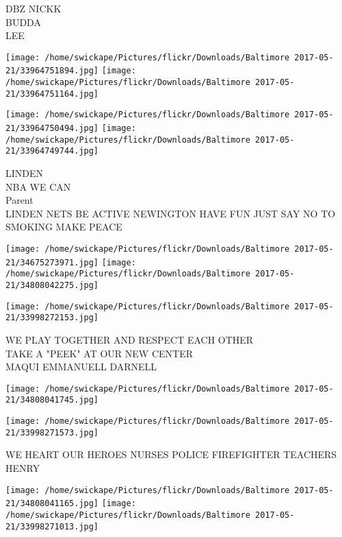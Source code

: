\documentclass[10pt,letterpaper]{article}
\begin{document}
DBZ NICKK\\
BUDDA\\
LEE\\
\pagebreak

\texttt{[image: /home/swickape/Pictures/flickr/Downloads/Baltimore 2017-05-21/33964751894.jpg]}
\texttt{[image: /home/swickape/Pictures/flickr/Downloads/Baltimore 2017-05-21/33964751164.jpg]}

\texttt{[image: /home/swickape/Pictures/flickr/Downloads/Baltimore 2017-05-21/33964750494.jpg]}
\texttt{[image: /home/swickape/Pictures/flickr/Downloads/Baltimore 2017-05-21/33964749744.jpg]}

LINDEN\\
NBA WE CAN\\
Parent\\
LINDEN NETS BE ACTIVE NEWINGTON HAVE FUN JUST SAY NO TO SMOKING MAKE PEACE\\
\pagebreak

\texttt{[image: /home/swickape/Pictures/flickr/Downloads/Baltimore 2017-05-21/34675273971.jpg]}
\texttt{[image: /home/swickape/Pictures/flickr/Downloads/Baltimore 2017-05-21/34808042275.jpg]}

\vspace{0.25in}
\texttt{[image: /home/swickape/Pictures/flickr/Downloads/Baltimore 2017-05-21/33998272153.jpg]}

WE PLAY TOGETHER AND RESPECT EACH OTHER\\
TAKE A "PEEK" AT OUR NEW CENTER\\
MAQUI EMMANUELL DARNELL\\
\pagebreak

\texttt{[image: /home/swickape/Pictures/flickr/Downloads/Baltimore 2017-05-21/34808041745.jpg]}

\vspace{0.25in}
\texttt{[image: /home/swickape/Pictures/flickr/Downloads/Baltimore 2017-05-21/33998271573.jpg]}

WE HEART OUR HEROES NURSES POLICE FIREFIGHTER TEACHERS\\
HENRY\\
\pagebreak

\texttt{[image: /home/swickape/Pictures/flickr/Downloads/Baltimore 2017-05-21/34808041165.jpg]}
\texttt{[image: /home/swickape/Pictures/flickr/Downloads/Baltimore 2017-05-21/33998271013.jpg]}
\end{document}
